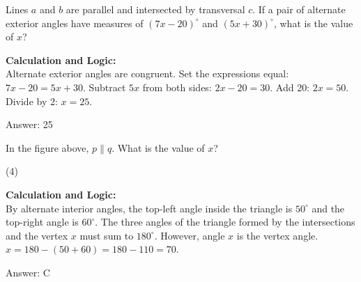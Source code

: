 \documentclass[11pt,paper=a4,answers]{exam}
\begin{document}
\begin{questions}
\vspace{60pt}

\question
Lines $a$ and $b$ are parallel and intersected by transversal $c$. If a pair of alternate exterior angles have measures of $(7x - 20)^\circ$ and $(5x + 30)^\circ$, what is the value of $x$?

\begin{solution}
\textbf{Calculation and Logic:} \\
Alternate exterior angles are congruent. Set the expressions equal: $7x - 20 = 5x + 30$. Subtract $5x$ from both sides: $2x - 20 = 30$. Add 20: $2x = 50$. Divide by 2: $x = 25$.

\vspace{30pt}

Answer: \colorbox{yellow!100}{25}
\end{solution}

\vspace{60pt}

\question
\begin{center}
\end{center}
In the figure above, $p \parallel q$. What is the value of $x$?
\begin{tasks}(4)
\end{tasks}

\begin{solution}
\textbf{Calculation and Logic:} \\
By alternate interior angles, the top-left angle inside the triangle is $50^\circ$ and the top-right angle is $60^\circ$. The three angles of the triangle formed by the intersections and the vertex $x$ must sum to $180^\circ$. However, angle $x$ is the vertex angle. $x = 180 - (50 + 60) = 180 - 110 = 70$.

\vspace{30pt}

Answer: \colorbox{yellow!100}{C}
\end{solution}


\end{questions}
\end{document}
